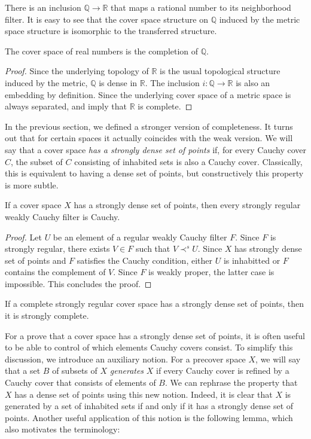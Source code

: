 \documentclass[reqno]{amsart}
\theoremstyle{definition}
\theoremstyle{remark}
\numberwithin{figure}{section}
\newcommand{\rb}{\prec}
\begin{document}
There is an inclusion $\mathbb{Q} \to \mathbb{R}$ that maps a rational number to its neighborhood filter.
It is easy to see that the cover space structure on $\mathbb{Q}$ induced by the metric space structure is isomorphic to the transferred structure.

\begin{prop}
The cover space of real numbers is the completion of $\mathbb{Q}$.
\end{prop}
\begin{proof}
Since the underlying topology of $\mathbb{R}$ is the usual topological structure induced by the metric, $\mathbb{Q}$ is dense in $\mathbb{R}$.
The inclusion $i : \mathbb{Q} \to \mathbb{R}$ is also an embedding by definition.
Since the underlying cover space of a metric space is always separated,  and  imply that $\mathbb{R}$ is complete.
\end{proof}

In the previous section, we defined a stronger version of completeness.
It turns out that for certain spaces it actually coincides with the weak version.
We will say that a cover space \emph{has a strongly dense set of points} if, for every Cauchy cover $C$, the subset of $C$ consisting of inhabited sets is also a Cauchy cover.
Classically, this is equivalent to having a dense set of points, but constructively this property is more subtle.

\begin{prop}
If a cover space $X$ has a strongly dense set of points, then every strongly regular weakly Cauchy filter is Cauchy.
\end{prop}
\begin{proof}
Let $U$ be an element of a regular weakly Cauchy filter $F$.
Since $F$ is strongly regular, there exists $V \in F$ such that $V \rb^s U$.
Since $X$ has strongly dense set of points and $F$ satisfies the Cauchy condition, either $U$ is inhabitted or $F$ contains the complement of $V$.
Since $F$ is weakly proper, the latter case is impossible.
This concludes the proof.
\end{proof}

\begin{cor}
If a complete strongly regular cover space has a strongly dense set of points, then it is strongly complete.
\end{cor}

For a prove that a cover space has a strongly dense set of points, it is often useful to be able to control of which elements Cauchy covers consist.
To simplify this discussion, we introduce an auxiliary notion.
For a precover space $X$, we will say that a set $B$ of subsets of $X$ \emph{generates} $X$ if every Cauchy cover is refined by a Cauchy cover that consists of elements of $B$.
We can rephrase the property that $X$ has a dense set of points using this new notion.
Indeed, it is clear that $X$ is generated by a set of inhabited sets if and only if it has a strongly dense set of points.
Another useful application of this notion is the following lemma, which also motivates the terminology:
\end{document}
